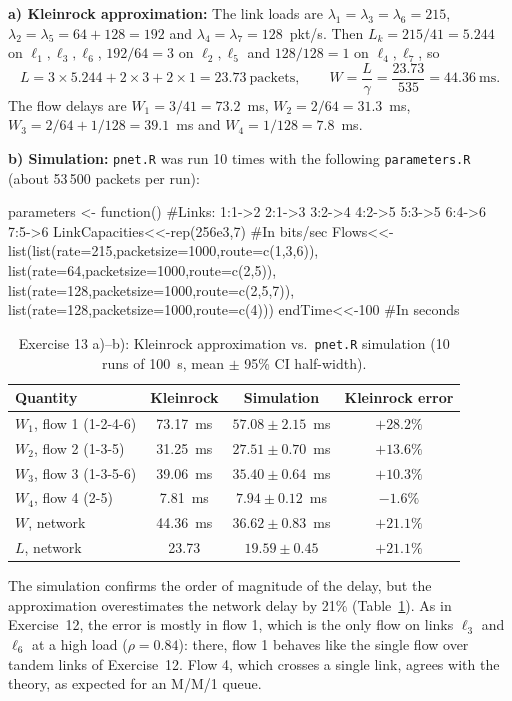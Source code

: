 ﻿\documentclass[12pt]{article}
\begin{document}
\textbf{a) Kleinrock approximation:} The link loads are
$\lambda_1=\lambda_3=\lambda_6=215$, $\lambda_2=\lambda_5=64+128=192$ and
$\lambda_4=\lambda_7=128$~pkt/s. Then $L_k=215/41=5.244$ on $\ell_1,\ell_3,\ell_6$,
$192/64=3$ on $\ell_2,\ell_5$ and $128/128=1$ on $\ell_4,\ell_7$, so
\[
L=3\times5.244+2\times3+2\times1=23.73~\text{packets}, \qquad
W=\frac{L}{\gamma}=\frac{23.73}{535}=44.36~\text{ms}.
\]
The flow delays are $W_1=3/41=73.2$~ms, $W_2=2/64=31.3$~ms,
$W_3=2/64+1/128=39.1$~ms and $W_4=1/128=7.8$~ms.

\textbf{b) Simulation:} \texttt{pnet.R} was run 10 times with the following
\texttt{parameters.R} (about 53\,500 packets per run):
\begin{configbox}
parameters <- function() {
  #Links: 1:1->2 2:1->3 3:2->4 4:2->5 5:3->5 6:4->6 7:5->6
  LinkCapacities<<-rep(256e3,7) #In bits/sec
  Flows<<-list(list(rate=215,packetsize=1000,route=c(1,3,6)),
               list(rate=64,packetsize=1000,route=c(2,5)),
               list(rate=128,packetsize=1000,route=c(2,5,7)),
               list(rate=128,packetsize=1000,route=c(4)))
  endTime<<-100 #In seconds
}
\end{configbox}

\begin{table}[H]
    \centering
    \caption{Exercise 13 a)--b): Kleinrock approximation vs.\ \texttt{pnet.R} simulation (10 runs of 100~s, mean $\pm$ 95\% CI half-width).}
    \label{tab:pnet13ab}
    \begin{tabular}{l|c|c|c}
        Quantity & Kleinrock & Simulation & Kleinrock error \\
        \hline
        $W_1$, flow 1 (1-2-4-6) & 73.17~ms & $57.08\pm2.15$~ms & $+28.2\%$ \\
        $W_2$, flow 2 (1-3-5)   & 31.25~ms & $27.51\pm0.70$~ms & $+13.6\%$ \\
        $W_3$, flow 3 (1-3-5-6) & 39.06~ms & $35.40\pm0.64$~ms & $+10.3\%$ \\
        $W_4$, flow 4 (2-5)     & 7.81~ms  & $7.94\pm0.12$~ms  & $-1.6\%$ \\
        $W$, network            & 44.36~ms & $36.62\pm0.83$~ms & $+21.1\%$ \\
        $L$, network            & 23.73    & $19.59\pm0.45$    & $+21.1\%$ \\
    \end{tabular}
\end{table}

The simulation confirms the order of magnitude of the delay, but the
approximation overestimates the network delay by 21\%
(Table~\ref{tab:pnet13ab}). As in Exercise~12, the error is mostly in flow 1,
which is the only flow on links $\ell_3$ and $\ell_6$ at a high load
($\rho=0.84$): there, flow 1 behaves like the single flow over tandem links of
Exercise~12. Flow 4, which crosses a single link, agrees with the theory, as
expected for an M/M/1 queue.
\end{document}
